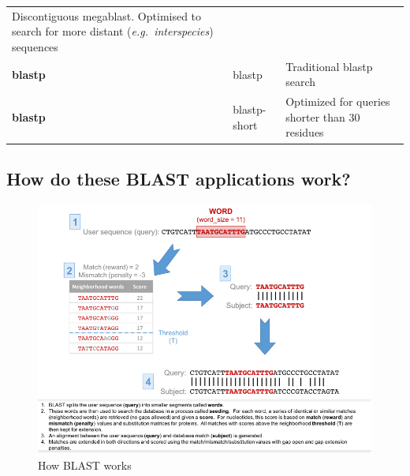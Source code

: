 \documentclass[11pt]{article}
\makeatletter
\def\maxwidth{\ifdim\Gin@nat@width>\linewidth\linewidth
    \else\Gin@nat@width\fi}
\let\Oldincludegraphics\includegraphics
\renewcommand{\includegraphics}[1]{\Oldincludegraphics[width=.8\maxwidth, height=.55\textheight, keepaspectratio]{#1}}
\makeatother
\begin{document}
\begin{longtable}[]{@{}lll@{}}
\begin{minipage}[t]{0.30\columnwidth}
Discontiguous megablast. Optimised to search for more distant
(\textit{e.g.~interspecies}) sequences\strut
\end{minipage}\tabularnewline
\begin{minipage}[t]{0.30\columnwidth}\raggedright
\textbf{blastp}\strut
\end{minipage} & \begin{minipage}[t]{0.30\columnwidth}\raggedright
blastp\strut
\end{minipage} & \begin{minipage}[t]{0.30\columnwidth}\raggedright
Traditional blastp search\strut
\end{minipage}\tabularnewline
\begin{minipage}[t]{0.30\columnwidth}\raggedright
\textbf{blastp}\strut
\end{minipage} & \begin{minipage}[t]{0.30\columnwidth}\raggedright
blastp-short\strut
\end{minipage} & \begin{minipage}[t]{0.30\columnwidth}\raggedright
Optimized for queries shorter than 30 residues\strut
\end{minipage}\tabularnewline
\hline
\end{longtable}

    \hypertarget{how-do-these-blast-applications-work}{%
\subsection{How do these BLAST applications
work?}\label{how-do-these-blast-applications-work}}

    \begin{figure}[!h]
\centering
\includegraphics{blast_methods.png}
\caption{How BLAST works}
\end{figure}
\end{document}
